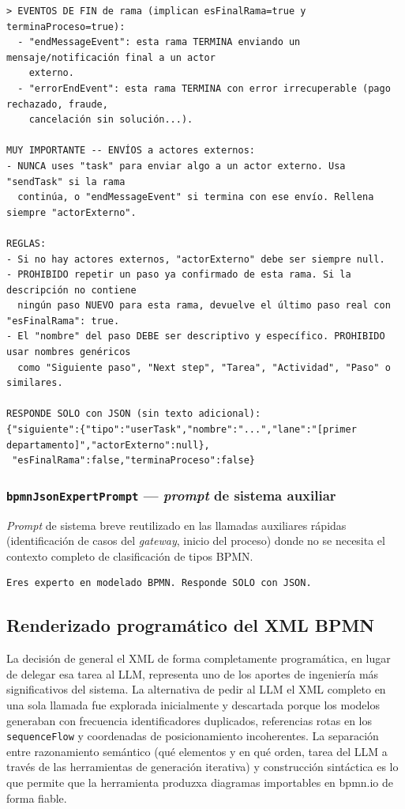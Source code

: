 \begin{lstlisting}[style=promptbox]
> EVENTOS DE FIN de rama (implican esFinalRama=true y terminaProceso=true):
  - "endMessageEvent": esta rama TERMINA enviando un mensaje/notificación final a un actor
    externo.
  - "errorEndEvent": esta rama TERMINA con error irrecuperable (pago rechazado, fraude,
    cancelación sin solución...).

MUY IMPORTANTE -- ENVÍOS a actores externos:
- NUNCA uses "task" para enviar algo a un actor externo. Usa "sendTask" si la rama
  continúa, o "endMessageEvent" si termina con ese envío. Rellena siempre "actorExterno".

REGLAS:
- Si no hay actores externos, "actorExterno" debe ser siempre null.
- PROHIBIDO repetir un paso ya confirmado de esta rama. Si la descripción no contiene
  ningún paso NUEVO para esta rama, devuelve el último paso real con "esFinalRama": true.
- El "nombre" del paso DEBE ser descriptivo y específico. PROHIBIDO usar nombres genéricos
  como "Siguiente paso", "Next step", "Tarea", "Actividad", "Paso" o similares.

RESPONDE SOLO con JSON (sin texto adicional):
{"siguiente":{"tipo":"userTask","nombre":"...","lane":"[primer departamento]","actorExterno":null},
 "esFinalRama":false,"terminaProceso":false}
\end{lstlisting}

\subsubsection{\texttt{bpmnJsonExpertPrompt} — \textit{prompt} de sistema auxiliar}

\textit{Prompt} de sistema breve reutilizado en las llamadas auxiliares rápidas (identificación de casos del \textit{gateway}, inicio del proceso) donde no se necesita el contexto completo de clasificación de tipos BPMN.

\begin{lstlisting}[style=promptbox]
Eres experto en modelado BPMN. Responde SOLO con JSON.
\end{lstlisting}

\subsection{Renderizado programático del XML BPMN}
\label{subsec:renderDiagram}

La decisión de general el XML de forma completamente programática, en lugar de delegar esa tarea al LLM, representa uno de los aportes de ingeniería más significativos del sistema. La alternativa de pedir al LLM el XML completo en una sola llamada fue explorada inicialmente y descartada porque los modelos generaban con frecuencia identificadores duplicados, referencias rotas en los \texttt{sequenceFlow} y coordenadas de posicionamiento incoherentes. La separación entre razonamiento semántico (qué elementos y en qué orden, tarea del LLM a través de las herramientas de generación iterativa) y construcción sintáctica es lo que permite que la herramienta produzxa diagramas  importables en bpmn.io de forma fiable.



